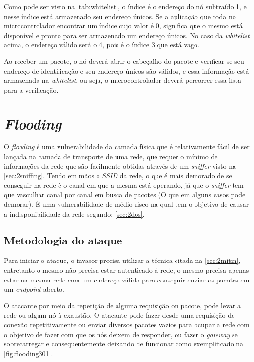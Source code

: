 \par Como pode ser visto na \autoref{tab:whitelist}, o índice é o endereço do nó subtraído 1, e nesse índice está armazenado seu endereço \'unicos. Se a aplicação que roda no microcontrolador encontrar um índice cujo valor é 0, significa que o mesmo está disponível e pronto para ser armazenado um endereço \'unicos. No caso da \emph{whitelist} acima, o endere\c{c}o v\'alido ser\'a o 4, pois \'e o \'indice 3 que est\'a vago. 


\par Ao receber um pacote, o n\'o dever\'a abrir o cabe\c{c}alho do pacote e verificar se seu endere\c{c}o de identifica\c{c}\~ao e seu endere\c{c}o \'unicos s\~ao v\'alidos, e essa informa\c{c}\~ao est\'a armazenada na \emph{whitelist}, ou seja, o microcontrolador dever\'a percorrer essa lista para a verifica\c{c}\~ao.


\section{\emph{Flooding}}
\label{sec:3flooding}
\par O \emph{flooding} é uma vulnerabilidade da camada física que é relativamente fácil de ser lançada na camada de transporte de uma rede, que requer o mínimo de informações da rede que são facilmente obtidas através de um \emph{sniffer} visto na \autoref{sec:2sniffing}. Tendo em mãos o \emph{SSID} da rede, o que é mais demorado de se conseguir na rede é o canal em que a mesma está operando, já que o \emph{sniffer} tem que vasculhar canal por canal em busca de pacotes (O que em alguns casos pode demorar). \'E uma vulnerabilidade de m\'edio risco na qual tem o objetivo de causar a indisponibilidade da rede segundo: \autoref{sec:2dos}.

\subsection{Metodologia do ataque}
\par Para iniciar o ataque, o invasor precisa utilizar a t\'ecnica citada na \autoref{sec:2mitm}, entretanto o mesmo n\~ao precisa estar autenticado \`a rede, o mesmo precisa apenas estar na mesma rede com um endere\c{c}o v\'alido para conseguir enviar os pacotes em um \emph{endpoint} aberto.

\par O atacante por meio da repetição de alguma requisição ou pacote, pode levar a rede ou algum n\'o à exaustão. O atacante pode fazer desde uma requisição de conexão repetitivamente ou enviar diversos pacotes vazios para ocupar a rede com o objetivo de fazer com que os nós deixem de responder, ou fazer o \emph{gateway} se sobrecarregar e consequentemente deixando de funcionar como exemplificado na \autoref{fig:flooding301}.


